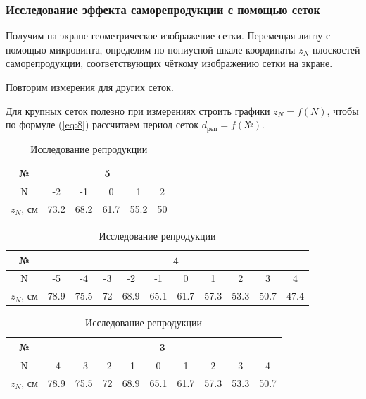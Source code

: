 \documentclass[a4paper, 12pt]{article}
\begin{document}
	\subsubsection{Исследование эффекта саморепродукции с помощью сеток}
	Получим на экране геометрическое изображение сетки. Перемещая линзу с помощью микровинта, определим по нониусной шкале координаты $z_N$ плоскостей саморепродукции, соответствующих чёткому изображению сетки на экране.\par
	Повторим измерения для других сеток.\par
	Для крупных сеток полезно при измерениях строить графики $z_N=f\left(N\right)$, чтобы по формуле (\ref{eq:8}) рассчитаем период сеток $d_\text{реп}=f\left(\text{№}\right)$.
	 \begin{table}[h]
	 	\centering
	 	\begin{tabular}{|c|c|c|c|c|c|}
	 		\hline
	 		№ & \multicolumn{5}{c|}{5}\\
	 		\hline
	 		N & -2 & -1 & 0 & 1 & 2\\
	 		$z_N$, см & 73.2 & 68.2 & 61.7 & 55.2 & 50\\
	 		\hline
	 	\end{tabular}
	 	\begin{tabular}{|c|c|c|c|c|c|c|c|c|c|c|}
	 		\hline
	 		№ & \multicolumn{10}{c|}{4}\\
	 		\hline
	 		N & -5 & -4 & -3 & -2 & -1 & 0 & 1 & 2 & 3 & 4\\
	 		$z_N$, см & 78.9 & 75.5 & 72 & 68.9 & 65.1 & 61.7 & 57.3 & 53.3 & 50.7 & 47.4\\
	 		\hline
	 	\end{tabular}
	 	
	 	\begin{tabular}{|c|c|c|c|c|c|c|c|c|c|}
	 		\hline
	 		№ & \multicolumn{9}{c|}{3}\\
	 		\hline
	 		N & -4 & -3 & -2 & -1 & 0 & 1 & 2 & 3 & 4\\
	 		$z_N$, см & 78.9 & 75.5 & 72 & 68.9 & 65.1 & 61.7 & 57.3 & 53.3 & 50.7 \\
	 		\hline
	 	\end{tabular}
	 	\caption{Исследование репродукции}
	 \end{table}
\end{document}
